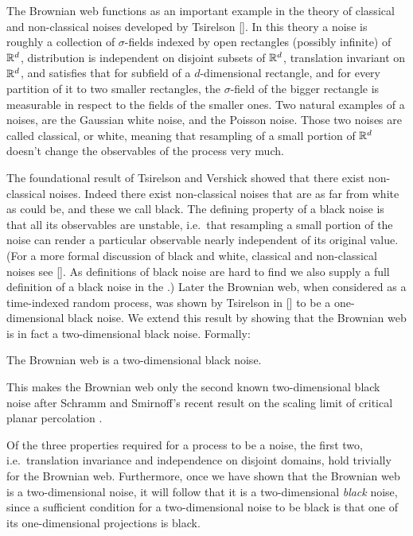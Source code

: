 {The Brownian web functions as an important example in the theory of classical
and non-classical noises developed by Tsirelson []. In this theory a noise is
roughly a collection of $\sigma$-fields indexed by open
rectangles (possibly infinite) of $\mathbb{R}^d$,
distribution is independent on disjoint subsets of $\mathbb{R}^d$, translation
invariant on $\mathbb{R}^d$, and satisfies that for subfield of a $d$-dimensional
rectangle, and for every partition of it to two smaller rectangles, the $\sigma$-field
of the bigger rectangle is measurable in respect to the fields of the
smaller ones. Two natural examples of a noises, are the Gaussian white noise,
and the Poisson noise. Those two noises are called classical, or white,
meaning that
resampling of a small portion of $\mathbb{R}^d$ doesn't change the observables of the
process very much.

The foundational result of Tsirelson and Vershick showed that there
exist non-classical noises.  Indeed there exist non-classical noises
that are as far from white as could be, and these we call black.  The
defining property of a black noise is that all its observables are
unstable, i.e.\ that resampling a small portion of the noise can
render a particular observable nearly independent of its original
value.  (For a more formal discussion of black and white, classical
and non-classical noises see [].  As definitions of black noise are
hard to find we also supply a full definition of a black noise in
the .)  Later the Brownian web,
when considered as a time-indexed random process,
was shown by Tsirelson in [] to be a one-dimensional black noise.  We
extend this
result by showing that the Brownian web is in fact a two-dimensional
black noise.  Formally:

\begin{theorem}
\label{thm:bw-2d-black-noise}
The Brownian web is a
two-dimensional black noise.
\end{theorem}

This makes the Brownian web only the second
known two-dimensional black noise after Schramm and Smirnoff's
recent result on the scaling limit of critical planar
percolation .

Of the three properties required for a process to be a noise, the
first two, i.e.\ translation invariance and independence on disjoint
domains, hold trivially for the Brownian web.  Furthermore, once we
have shown that the Brownian web is a two-dimensional noise, it will
follow that it is a two-dimensional \emph{black} noise, since a
sufficient condition for a two-dimensional noise to be black is that
one of its one-dimensional projections is black.

}
